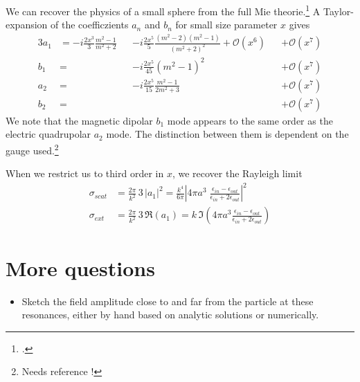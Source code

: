 We can recover the physics of a small sphere from the full Mie theorie.\footcite[chapter 5]{BH-book} A Taylor-expansion of the coefficzients $a_n$ and $b_n$ for small size parameter $x$ gives
\begin{alignat}{3}
 a_1 &= -i \frac{2x^3}{3} \frac{m^2 -1}{m^2 + 2} && -i \frac{2x^5}{5} \frac{(m^2 -2)(m^2-1)}{(m^2 + 2)^2} + \mathcal{O}(x^6)  && + \mathcal{O}(x^7) \\
 b_1 &=  && -i \frac{2x^5}{45} (m^2 -1)^2  &&+ \mathcal{O}(x^7)  \\
 a_2 &=   &&-i \frac{2x^5}{15} \frac{m^2-1}{2 m^2 +3} &&+ \mathcal{O}(x^7)  \\
b_2 &= && &&+ \mathcal{O}(x^7)  
\end{alignat}
We note that the magnetic dipolar $b_1$ mode appears to the same order as the electric quadrupolar $a_2$ mode. The distinction between them is dependent on the gauge used.\footnote{Needs reference !}

When we restrict us to third order in $x$, we recover the Rayleigh limit
\begin{eqnarray}
\sigma_{scat} & = \frac{2 \pi }{k^2} \, 3 \, \left| a_1 \right|^2 
 = \frac{k^4}{6 \pi} \left| 4 \pi a^3  \; \frac{\epsilon_{in} - \epsilon_{out}}{\epsilon_{in} + 2 \epsilon_{out}} \right|^2 \\
\sigma_{ext} & = \frac{2 \pi }{k^2} \, 3 \, \Re \left( a_1 \right) 
= k \, \Im \left( 4 \pi a^3 \frac{\epsilon_{in} - \epsilon_{out}}{\epsilon_{in} + 2 \epsilon_{out}}  \right)
\end{eqnarray}


\section{More questions}

\begin{itemize}
\item Sketch the field amplitude close to and far from the particle at these resonances, either by hand based on analytic solutions or numerically.
\end{itemize}


\printbibliography[segment=\therefsegment,heading=subbibliography]

